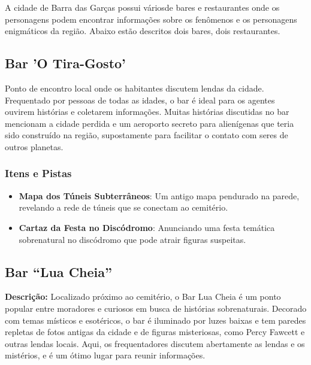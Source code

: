 A cidade de Barra das Garças possui váriosde bares e restaurantes  onde os personagens podem encontrar informações sobre os fenômenos e os personagens enigmáticos da região. Abaixo estão descritos dois bares, dois restaurantes.

\subsection{Bar 'O Tira-Gosto'}

Ponto de encontro local onde os habitantes discutem lendas da cidade. Frequentado por pessoas de todas as idades, o bar é ideal para os agentes ouvirem histórias e coletarem informações. Muitas histórias discutidas no bar mencionam a cidade perdida e um aeroporto secreto para alienígenas que teria sido construído na região, supostamente para facilitar o contato com seres de outros planetas.

\subsubsection{Itens e Pistas}

\begin{itemize}
    \item \textbf{Mapa dos Túneis Subterrâneos}: Um antigo mapa pendurado na parede, revelando a rede de túneis que se conectam ao cemitério.
    \item \textbf{Cartaz da Festa no Discódromo}: Anunciando uma festa temática sobrenatural no discódromo que pode atrair figuras suspeitas.
\end{itemize}

\subsection{Bar ``Lua Cheia''}
\textbf{Descrição:}  
Localizado próximo ao cemitério, o Bar Lua Cheia é um ponto popular entre moradores e curiosos em busca de histórias sobrenaturais. Decorado com temas místicos e esotéricos, o bar é iluminado por luzes baixas e tem paredes repletas de fotos antigas da cidade e de figuras misteriosas, como Percy Fawcett e outras lendas locais. Aqui, os frequentadores discutem abertamente as lendas e os mistérios, e é um ótimo lugar para reunir informações.



